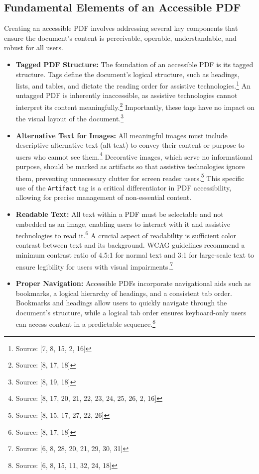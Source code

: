 \subsection{Fundamental Elements of an Accessible PDF}

Creating an accessible PDF involves addressing several key components that ensure the document's content is perceivable, operable, understandable, and robust for all users.

\begin{itemize}[noitemsep,topsep=0pt]
    \item \textbf{Tagged PDF Structure:} The foundation of an accessible PDF is its tagged structure. Tags define the document's logical structure, such as headings, lists, and tables, and dictate the reading order for assistive technologies.\footnote{Source: [7, 8, 15, 2, 16]} An untagged PDF is inherently inaccessible, as assistive technologies cannot interpret its content meaningfully.\footnote{Source: [8, 17, 18]} Importantly, these tags have no impact on the visual layout of the document.\footnote{Source: [8, 19, 18]}
    \item \textbf{Alternative Text for Images:} All meaningful images must include descriptive alternative text (alt text) to convey their content or purpose to users who cannot see them.\footnote{Source: [8, 17, 20, 21, 22, 23, 24, 25, 26, 2, 16]} Decorative images, which serve no informational purpose, should be marked as artifacts so that assistive technologies ignore them, preventing unnecessary clutter for screen reader users.\footnote{Source: [8, 15, 17, 27, 22, 26]} This specific use of the \texttt{Artifact} tag is a critical differentiator in PDF accessibility, allowing for precise management of non-essential content.
    \item \textbf{Readable Text:} All text within a PDF must be selectable and not embedded as an image, enabling users to interact with it and assistive technologies to read it.\footnote{Source: [8, 17, 18]} A crucial aspect of readability is sufficient color contrast between text and its background. WCAG guidelines recommend a minimum contrast ratio of 4.5:1 for normal text and 3:1 for large-scale text to ensure legibility for users with visual impairments.\footnote{Source: [6, 8, 28, 20, 21, 29, 30, 31]}
    \item \textbf{Proper Navigation:} Accessible PDFs incorporate navigational aids such as bookmarks, a logical hierarchy of headings, and a consistent tab order. Bookmarks and headings allow users to quickly navigate through the document's structure, while a logical tab order ensures keyboard-only users can access content in a predictable sequence.\footnote{Source: [6, 8, 15, 11, 32, 24, 18]}

\end{itemize}

